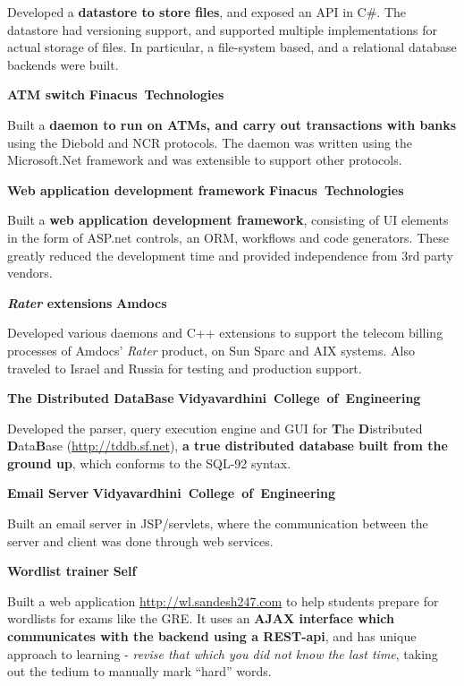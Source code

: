 \documentclass[a4paper,11pt,final]{article}
\newcommand{\projexp}[2]{%
  \vspace{12pt}
  \noindent\textbf{{#1}}
  \hfill
  \hbox{\textbf{{#2}}}
  \\ \vspace{-12pt}
}
\begin{document}
\noindent Developed a \textbf{datastore to store files}, and exposed
an API in C\#. The datastore had versioning support, and supported
multiple implementations for actual storage of files. In particular, a
file-system based, and a relational database backends were built.

\projexp{ATM switch}{Finacus Technologies} 

\noindent Built a \textbf{daemon to run on ATMs, and carry out
  transactions with banks} using the Diebold and NCR protocols. The
daemon was written using the Microsoft.Net framework and was
extensible to support other protocols.

\projexp{Web application development framework}{Finacus Technologies}

\noindent Built a \textbf{web application development framework}, consisting of
UI elements in the form of ASP.net controls, an ORM, workflows and
code generators. These greatly reduced the development time and
provided independence from 3rd party vendors.

\projexp{\textit{Rater} extensions}{Amdocs} 

\noindent Developed various daemons and C++ extensions to support the
telecom billing processes of Amdocs' \textit{Rater} product, on Sun
Sparc and AIX systems. Also traveled to Israel and Russia for
testing and production support.

\projexp{The Distributed DataBase}{Vidyavardhini College of
  Engineering} 

\noindent Developed the parser, query execution engine and GUI for
\textbf{T}he \textbf{D}istributed \textbf{D}ata\textbf{B}ase
(\url{http://tddb.sf.net}), \textbf{a true distributed database built
  from the ground up}, which conforms to the SQL-92 syntax.

\projexp{Email Server}{Vidyavardhini College of Engineering} 

\noindent Built an email server in JSP/servlets, where the
communication between the server and client was done through web
services.

\projexp{Wordlist trainer}{Self}

\noindent Built a web application \url{http://wl.sandesh247.com} to
help students prepare for wordlists for exams like the GRE. It uses an
\textbf{AJAX interface which communicates with the backend using a
  REST-api}, and has unique approach to learning - \textit{revise that
  which you did not know the last time}, taking out the tedium to
manually mark ``hard'' words.
\end{document}
